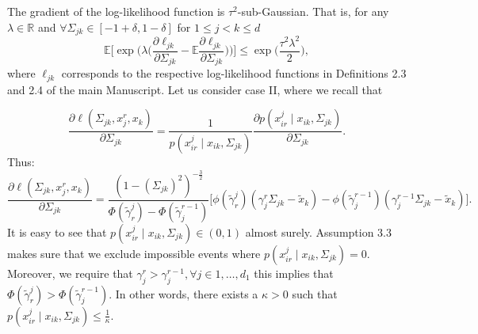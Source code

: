 \begin{condition}\label{Gradient statistical noise}
    The gradient of the log-likelihood function is $\tau^2$-sub-Gaussian. That is, for any $\lambda \in \mathbb{R}$ and $\forall \Sigma_{jk} \in [-1+\delta, 1-\delta]$ for $1\leq j < k \leq d$
    \begin{equation}
        \mathbb{E}\Bigg[\exp\Bigg(\lambda \Big(\frac{\partial\ell_{jk}}{\partial \Sigma_{jk}} - \mathbb{E}\frac{\partial\ell_{jk}}{\partial \Sigma_{jk}} \Big) \Bigg)\Bigg] \leq \exp\Big(\frac{\tau^2\lambda^2}{2}\Big),
    \end{equation}
    where $\ell_{jk}$ corresponds to the respective log-likelihood functions in Definitions 2.3 and 2.4 of the main Manuscript.
    Let us consider case II, where we recall that

    \begin{equation*}
        \frac{\partial\ell(\Sigma_{jk}, x_j^r,x_k)}{\partial \Sigma_{jk}} = \frac{1}{p(x^j_{ir} \mid x_{ik}, \Sigma_{jk})} \frac{\partial p(x^j_{ir} \mid x_{ik}, \Sigma_{jk})}{\partial \Sigma_{jk}}.
    \end{equation*}
    Thus:
    \begin{equation*}
        \frac{\partial\ell(\Sigma_{jk}, x_j^r,x_k)}{\partial \Sigma_{jk}} = \frac{(1-(\Sigma_{jk})^2)^{-\frac{3}{2}}}{\Phi({\tilde{\gamma}}^j_{r}) - \Phi({\tilde{\gamma}}_j^{r-1})} \Bigg[\phi({\tilde{\gamma}}^j_{r})({\gamma}_j^r\Sigma_{jk} - {\tilde{x}}_{k}) - \phi({\tilde{\gamma}}_j^{r-1})({\gamma}_j^{r-1}\Sigma_{jk} - {\tilde{x}}_{k})\Bigg].
    \end{equation*}
    It is easy to see that $p(x^j_{ir} \mid x_{ik}, \Sigma_{jk}) \in (0,1)$ almost surely. Assumption 3.3
    makes sure that we exclude impossible events where $p(x^j_{ir} \mid x_{ik}, \Sigma_{jk}) = 0$. Moreover, we require that $\gamma_j^r > \gamma_j^{r-1}, \forall j \in 1, \dots, d_1$ this implies that $\Phi({\tilde{\gamma}}^j_{r}) > \Phi({\tilde{\gamma}}_j^{r-1})$. In other words, there exists a $\kappa >0$ such that $p(x^j_{ir} \mid x_{ik}, \Sigma_{jk}) \leq \frac{1}{\kappa}$.


\end{condition}

